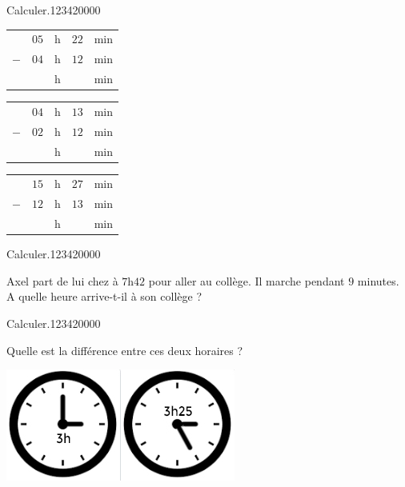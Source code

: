 \begin{pageParcoursu}
\begin{ExoCu}{ Calculer.}{1234}{2}{0}{0}{0}{0}
 
 \begin{minipage}{0.30\linewidth}
\begin{tabular}{ccccc} 
& $05$ & h &  $22$ & min \\ 
$-$   & $04$ & h & $12$ & min\\ 
\hline 
   &  & h & & min\\
\end{tabular} 
\end{minipage}
\hfill 
\begin{minipage}{0.30\linewidth}
 \begin{tabular}{ccccc} 
& $04$ & h &  $13$ & min \\ 
$-$   & $02$ & h &  $12$ & min\\ 
\hline 
   &  & h & & min\\
\end{tabular} 
\end{minipage}
\hfill 
\begin{minipage}{0.30\linewidth}
 \begin{tabular}{ccccc} 
& $15$ & h & $27$  & min \\ 
$-$   & $12$ & h & $13$ & min\\ 
\hline 
   &  & h & & min\\
\end{tabular} 
\end{minipage}
 

\end{ExoCu}

\begin{ExoCu}{ Calculer.}{1234}{2}{0}{0}{0}{0}
 
 
 
 Axel part de lui chez à $7$h$42$ pour aller au collège. Il marche pendant $9$ minutes. A quelle heure arrive-t-il à son collège ?


\end{ExoCu}

\begin{ExoCu}{ Calculer.}{1234}{2}{0}{0}{0}{0}
 
 

\begin{minipage}{0.60\linewidth} 
 Quelle est la différence entre ces deux horaires ?
\end{minipage}
\hfill 
\begin{minipage}{0.40\linewidth}
 \includegraphics[scale=1]{FIG/grandeurs_mesures/heure_delta.jpg} 
\end{minipage}

\end{ExoCu}


\end{pageParcoursu}

